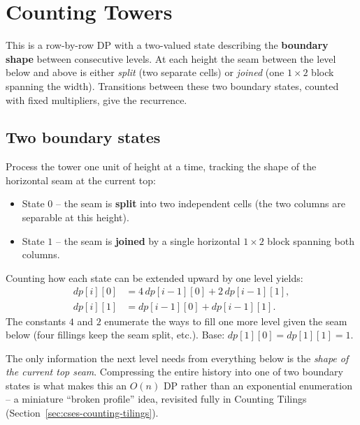 \section{Counting Towers}
\label{sec:cses-counting-towers}


\begin{patternbox}
This is a row-by-row DP with a two-valued state describing the
\textbf{boundary shape} between consecutive levels. At each height the
seam between the level below and above is either \emph{split} (two
separate cells) or \emph{joined} (one $1\times2$ block spanning the
width). Transitions between these two boundary states, counted with fixed
multipliers, give the recurrence.
\end{patternbox}

\subsection*{Two boundary states}

Process the tower one unit of height at a time, tracking the shape of the
horizontal seam at the current top:
\begin{itemize}
  \item State $0$ -- the seam is \textbf{split} into two independent
        cells (the two columns are separable at this height).
  \item State $1$ -- the seam is \textbf{joined} by a single horizontal
        $1\times2$ block spanning both columns.
\end{itemize}
Counting how each state can be extended upward by one level yields:
\[
  \begin{aligned}
    \textit{dp}[i][0] &= 4\,\textit{dp}[i-1][0] + 2\,\textit{dp}[i-1][1],\\
    \textit{dp}[i][1] &= \textit{dp}[i-1][0] + \textit{dp}[i-1][1].
  \end{aligned}
\]
The constants $4$ and $2$ enumerate the ways to fill one more level given
the seam below (four fillings keep the seam split, etc.). Base:
$\textit{dp}[1][0]=\textit{dp}[1][1]=1$.

\begin{ideabox}
The only information the next level needs from everything below is the
\emph{shape of the current top seam}. Compressing the entire history into
one of two boundary states is what makes this an $O(n)$ DP rather than an
exponential enumeration -- a miniature ``broken profile'' idea, revisited
fully in Counting Tilings (Section~\ref{sec:cses-counting-tilings}).
\end{ideabox}

